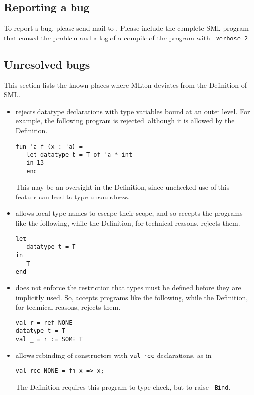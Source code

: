 %
\subsection{Reporting a bug}

To report a bug, please send mail to {\mltonmail}.  Please include the
complete SML program that caused the problem and a log of a compile of
the program with {\tt -verbose 2}.
%
\subsection{Unresolved bugs}

This section lists the known places where MLton deviates from the
Definition of SML.

\begin{itemize}

\item
{\mlton} rejects datatype declarations with type variables bound at
an outer level.  For example, the following program is rejected,
although it is allowed by the Definition.
\begin{verbatim}
fun 'a f (x : 'a) =
   let datatype t = T of 'a * int
   in 13
   end
\end{verbatim}
This may be an oversight in the Definition, since unchecked use of
this feature can lead to type unsoundness.

\item
{\mlton} allows local type names to escape their scope, and so accepts
the programs like the following, while the Definition, for technical
reasons, rejects them.
\begin{verbatim}
let
   datatype t = T
in
   T
end
\end{verbatim}
%
\item
{\mlton} does not enforce the restriction that types must be defined
before they are implicitly used.  So, {\mlton} accepts programs like
the following, while the Definition, for technical reasons, rejects
them.
\begin{verbatim}
val r = ref NONE
datatype t = T
val _ = r := SOME T
\end{verbatim}
%
\item
{\mlton} allows rebinding of constructors with {\tt val rec}
declarations, as in
\begin{verbatim}
val rec NONE = fn x => x;
\end{verbatim}
The Definition requires this program to type check, but to raise {\tt
Bind}.


\end{itemize}
